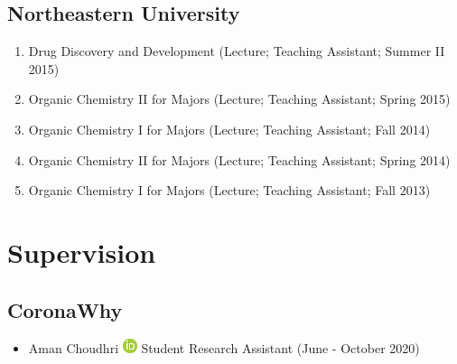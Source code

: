 \documentclass[10pt,a4paper,sans]{moderncv} %
\begin{document}
        \subsection{Northeastern University}
        \begin{enumerate}
        \item     Drug Discovery and Development (Lecture; Teaching Assistant; Summer II 2015)

        \item     Organic Chemistry II for Majors (Lecture; Teaching Assistant; Spring 2015)

        \item     Organic Chemistry I for Majors (Lecture; Teaching Assistant; Fall 2014)

        \item     Organic Chemistry II for Majors (Lecture; Teaching Assistant; Spring 2014)

        \item     Organic Chemistry I for Majors (Lecture; Teaching Assistant; Fall 2013)

        \end{enumerate}

    \section{Supervision}
    \subsection{CoronaWhy}
        \begin{itemize}
        \item     Aman Choudhri {\scriptsize     \href{https://orcid.org/0000-0003-4963-6651}{\includegraphics[scale=0.5]{img/ORCIDiD_icon16x16}}
}    Student Research Assistant (June - October 2020)

        \end{itemize}
\end{document}
